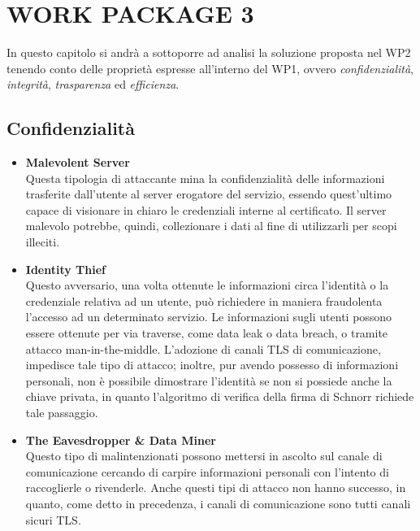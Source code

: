 \chapter{WORK PACKAGE 3}
    In questo capitolo si andrà a sottoporre ad analisi la soluzione proposta nel WP2 tenendo conto delle proprietà espresse all’interno del WP1, ovvero \textit{confidenzialità}, \textit{integrità}, \textit{trasparenza} ed \textit{efficienza}.

    \section{Confidenzialità}
        \begin{itemize}
            \item \textbf{Malevolent Server} \\
                Questa tipologia di attaccante mina la confidenzialità delle informazioni trasferite dall'utente al server erogatore del servizio, essendo quest'ultimo capace di visionare in chiaro le credenziali interne al certificato.
                Il server malevolo potrebbe, quindi, collezionare i dati al fine di utilizzarli per scopi illeciti.

            \item \textbf{Identity Thief} \\
                Questo avversario, una volta ottenute le informazioni circa l'identità o la credenziale relativa ad un utente, può richiedere in maniera fraudolenta l'accesso ad un determinato servizio.
                Le informazioni sugli utenti possono essere ottenute per via traverse, come data leak o data breach, o tramite attacco man-in-the-middle.
                L'adozione di canali TLS di comunicazione, impedisce tale tipo di attacco; inoltre, pur avendo possesso di informazioni personali, non è possibile dimostrare l'identità se non si possiede anche la chiave privata, in quanto l'algoritmo di verifica della firma di Schnorr richiede tale passaggio.

            \item \textbf{The Eavesdropper \& Data Miner} \\
                Questo tipo di malintenzionati possono mettersi in ascolto sul canale di comunicazione cercando di carpire informazioni personali con l'intento di raccoglierle o rivenderle.
                Anche questi tipi di attacco non hanno successo, in quanto, come detto in precedenza, i canali di comunicazione sono tutti canali sicuri TLS.


\end{itemize}
